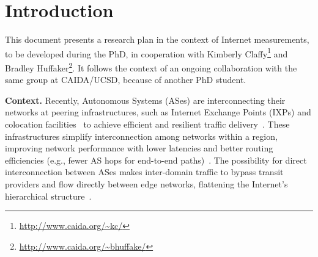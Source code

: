 \chapter{Introduction}\label{cap:introduction}
\thispagestyle{empty}

	This document presents a research plan in the context of Internet measurements, to be developed during the PhD, in cooperation with Kimberly Claffy\footnote{\url{http://www.caida.org/~kc/}} and Bradley Huffaker\footnote{\url{http://www.caida.org/~bhuffake/}}. It follows the context of an ongoing collaboration with the same group at CAIDA/UCSD, because of another PhD student. 

	\textbf{Context.} Recently, Autonomous Systems (ASes) are interconnecting their networks at peering infrastructures, such as Internet Exchange Points (IXPs) and colocation facilities~\cite{Giotsas:2015:MPI:2716281.2836122} to achieve efficient and resilient traffic delivery~\cite{Yap:2017:TEO:3098822.3098854, Schlinker:2017:EEE:3098822.3098853, marcos:2018:dynamix}. These infrastructures simplify interconnection among networks within a region, improving network performance with lower latencies and better routing efficiencies (e.g., fewer AS hops for end-to-end paths)~\cite{Chatzis:2013}. The possibility for direct interconnection between ASes makes inter-domain traffic to bypass transit providers and flow directly between edge networks, flattening the Internet’s hierarchical structure~\cite{Labovitz:2010:IIT:1851182.1851194}.


